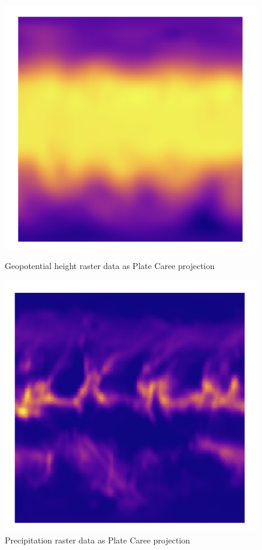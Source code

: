 \begin{figure}[h]
    \centering
    \begin{minipage}{0.45\textwidth}
        \centering
        \includegraphics[width=0.9\linewidth]{figures/chapter-5/plate_caree_geopoth_raster.png}
        \caption{ Geopotential height raster data as Plate Caree projection}
        \label{fig:plate_geopoth_raster}
    \end{minipage}\hfill
    \begin{minipage}{0.45\textwidth}
        \centering
        \includegraphics[width=0.9\linewidth]{figures/chapter-5/plate_caree_prect_raster.png}
        \caption{Precipitation raster data as Plate Caree projection}
        \label{fig:plate_prect_raster}
    \end{minipage}\hfill
\end{figure}

